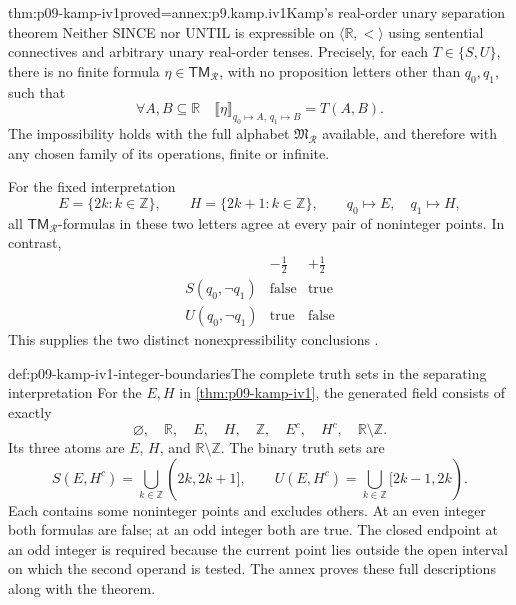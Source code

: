 \begin{hbtheorem}{thm:p09-kamp-iv1}{proved=annex:p9.kamp.iv1}{Kamp's real-order unary separation theorem}
Neither SINCE nor UNTIL is expressible on
\(\langle\mathbb R,<\rangle\) using sentential connectives and
arbitrary unary real-order tenses. Precisely, for each
\(T\in\{S,U\}\), there is no finite formula
\(\eta\in\mathsf{TM}_{\mathcal R}\), with no proposition
letters other than \(q_0,q_1\), such that
\[
 \forall A,B\subseteq\mathbb R\quad
       \llbracket\eta\rrbracket_{q_0\mapsto A,\,q_1\mapsto B}
                           =T(A,B).
\]
The impossibility holds with the full alphabet
\(\mathfrak M_{\mathcal R}\) available, and therefore with any
chosen family of its operations, finite or infinite.

For the fixed interpretation
\[
 E=\{2k:k\in\mathbb Z\},\qquad
 H=\{2k+1:k\in\mathbb Z\},\qquad
 q_0\mapsto E,\quad q_1\mapsto H,
\]
all \(\mathsf{TM}_{\mathcal R}\)-formulas in these two letters
agree at every pair of noninteger points. In contrast,
\[
\begin{array}{c|cc}
 & -\tfrac12 & +\tfrac12\\ \hline
 S(q_0,\neg q_1)&\text{false}&\text{true}\\
 U(q_0,\neg q_1)&\text{true}&\text{false}
\end{array}
\]
This supplies the two distinct nonexpressibility conclusions
\cite[ch.~IV, thm.~1, pp.~95--99]{Kamp1968}.
\end{hbtheorem}

\begin{hbexample}{def:p09-kamp-iv1-integer-boundaries}{The complete truth sets in the separating interpretation}
For the \(E,H\) in \cref{thm:p09-kamp-iv1}, the generated
field consists of exactly
\[
 \varnothing,\quad\mathbb R,\quad E,\quad H,\quad\mathbb Z,
 \quad E^c,\quad H^c,\quad\mathbb R\setminus\mathbb Z.
\]
Its three atoms are \(E\), \(H\), and
\(\mathbb R\setminus\mathbb Z\). The binary truth sets are
\[
 S(E,H^c)=\bigcup_{k\in\mathbb Z}(2k,2k+1],\qquad
 U(E,H^c)=\bigcup_{k\in\mathbb Z}[2k-1,2k).
\]
Each contains some noninteger points and excludes others. At an even
integer both formulas are false; at an odd integer both are true.
The closed endpoint at an odd integer is required because the current
point lies outside the open interval on which the second operand is
tested. The annex proves these full descriptions along with the theorem.
\end{hbexample}


